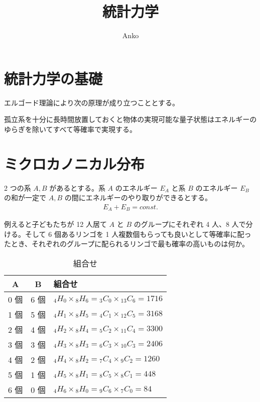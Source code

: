 \documentclass[uplatex,dvipdfmx,a4paper,11pt]{jlreq}
\title{統計力学}
\author{Anko}
\theoremstyle{definition}
\begin{document}
\maketitle
\tableofcontents
\clearpage

\section{統計力学の基礎}
エルゴード理論により次の原理が成り立つこととする。
\begin{axiom}[等確率の原理]
  孤立系を十分に長時間放置しておくと物体の実現可能な量子状態はエネルギーのゆらぎを除いてすべて等確率で実現する。
\end{axiom}

\section{ミクロカノニカル分布}
2 つの系 $A, B$ があるとする。系 $A$ のエネルギー $E_A$ と系 $B$ のエネルギー $E_B$ の和が一定で $A, B$ の間にエネルギーのやり取りができるとする。
\begin{align}
  E_A + E_B = const.
\end{align}

例えると子どもたちが 12 人居て $A$ と $B$ のグループにそれぞれ 4 人、8 人で分ける。そして 6 個あるリンゴを 1 人複数個もらっても良いとして等確率に配ったとき、それぞれのグループに配られるリンゴで最も確率の高いものは何か。
\begin{table}[hbtp]
  \label{table:micro}
  \centering
  \begin{tabular}{|c|c|l|}
    \hline
    A   & B   & 組合せ                                                         \\
    \hline
    0 個 & 6 個 & ${}_4H_0\times {}_{8}H_6 = {}_3C_0\times {}_{13}C_6 = 1716$ \\
    1 個 & 5 個 & ${}_4H_1\times {}_{8}H_5 = {}_4C_1\times {}_{12}C_5 = 3168$ \\
    2 個 & 4 個 & ${}_4H_2\times {}_{8}H_4 = {}_5C_2\times {}_{11}C_4 = 3300$ \\
    3 個 & 3 個 & ${}_4H_3\times {}_{8}H_3 = {}_6C_3\times {}_{10}C_3 = 2406$ \\
    4 個 & 2 個 & ${}_4H_4\times {}_{8}H_2 = {}_7C_4\times {}_{9}C_2 = 1260$  \\
    5 個 & 1 個 & ${}_4H_5\times {}_{8}H_1 = {}_8C_5\times {}_{8}C_1 = 448$   \\
    6 個 & 0 個 & ${}_4H_6\times {}_{8}H_0 = {}_9C_6\times {}_{7}C_0 = 84$    \\
    \hline
  \end{tabular}
  \caption{組合せ}
\end{table}
\end{document}
